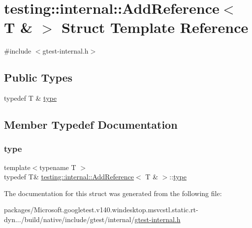 \hypertarget{structtesting_1_1internal_1_1_add_reference_3_01_t_01_6_01_4}{}\section{testing\+::internal\+::Add\+Reference$<$ T \& $>$ Struct Template Reference}
\label{structtesting_1_1internal_1_1_add_reference_3_01_t_01_6_01_4}


{\ttfamily \#include $<$gtest-\/internal.\+h$>$}

\subsection*{Public Types}
\begin{DoxyCompactItemize}
\item 
typedef T \& \mbox{\hyperlink{structtesting_1_1internal_1_1_add_reference_3_01_t_01_6_01_4_a93c064cdcdaced0abd167258425e57af}{type}}
\end{DoxyCompactItemize}


\subsection{Member Typedef Documentation}
\mbox{\label{structtesting_1_1internal_1_1_add_reference_3_01_t_01_6_01_4_a93c064cdcdaced0abd167258425e57af}} 
\subsubsection{\texorpdfstring{type}{type}}
{\footnotesize\ttfamily template$<$typename T $>$ \\
typedef T\& \mbox{\hyperlink{structtesting_1_1internal_1_1_add_reference}{testing\+::internal\+::\+Add\+Reference}}$<$ T \& $>$\+::\mbox{\hyperlink{structtesting_1_1internal_1_1_add_reference_3_01_t_01_6_01_4_a93c064cdcdaced0abd167258425e57af}{type}}}



The documentation for this struct was generated from the following file\+:\begin{DoxyCompactItemize}
\item 
packages/\+Microsoft.\+googletest.\+v140.\+windesktop.\+msvcstl.\+static.\+rt-\/dyn.../build/native/include/gtest/internal/\mbox{\hyperlink{gtest-internal_8h}{gtest-\/internal.\+h}}\end{DoxyCompactItemize}
